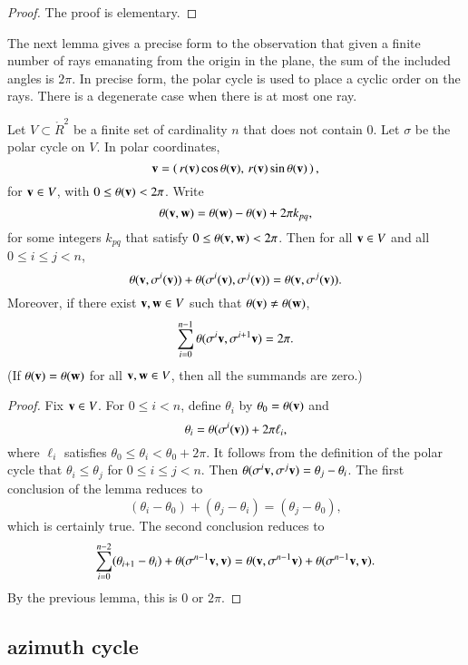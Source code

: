 \begin{proof} The proof is elementary.
\end{proof}

The next lemma gives a precise form to the observation
that given a finite number of rays emanating from the origin
in the plane, the sum of the included angles is $2\pi$.
In precise form, the polar cycle is used to place
a cyclic order on the rays.  There is a degenerate case
when there is at most one ray.


\begin{lemma}[]\label{lemma:polar-sum}
  Let $V\subset\ring{R}^2$ be a finite set of cardinality $n$ that
  does not contain $0$.  Let $\sigma$ be the polar cycle on $V$.  In
  polar coordinates,
\[ 
{\mathbf v}=\left(\, r({\mathbf v})\cos\theta({\mathbf v}),\, r({\mathbf v})\sin\theta({\mathbf v})\,\right),
\]  
for ${\mathbf v}\in V$, with
$0\le\theta({\mathbf v})<2\pi$.
Write
\[ 
\theta({\mathbf v},{\mathbf w}) = \theta({\mathbf w}) - \theta({\mathbf v}) + 2\pi k_{pq},
\] 
for some integers $k_{pq}$ that satisfy $0\le \theta({\mathbf v},{\mathbf w}) < 2\pi$.
Then for all ${\mathbf v}\in V$
and all $0\le i \le j < n$,
\[ 
\theta({\mathbf v},\sigma^i({\mathbf v})) +\theta(\sigma^i({\mathbf v}),\sigma^j({\mathbf v})) =
\theta({\mathbf v},\sigma^j({\mathbf v})).
\] 
Moreover, if there exist ${\mathbf v},{\mathbf w}\in V$ such that $\theta({\mathbf v})\ne\theta({\mathbf w})$,
\[ 
\sum_{i=0}^{n-1} \theta(\sigma^{i}{\mathbf v},\sigma^{i+1} {\mathbf v}) = 2\pi.
\] 
(If $\theta({\mathbf v})=\theta({\mathbf w})$ for all ${\mathbf v},{\mathbf w}\in V$, then all the
summands are zero.)
\end{lemma}
%

\begin{proof}
Fix ${\mathbf v}\in V$.
For $0\le i<n$, define $\theta_i$ by
$\theta_0=\theta({\mathbf v})$ and 
\[ \theta_i = \theta(\sigma^i({\mathbf v})) + 2\pi \ell_i,
\] 
where  $\ell_i$ satisfies $\theta_0\le \theta_i < \theta_0+2\pi$.
It follows from the definition of the polar cycle that
$\theta_i \le \theta_j$ for $0\le i\le j < n$.  Then
$\theta(\sigma^i {\mathbf v} ,\sigma^j {\mathbf v}) = \theta_j - \theta_i$.
The first conclusion of the lemma reduces to
\[ 
(\theta_i-\theta_0) + (\theta_j-\theta_i) = (\theta_j-\theta_0),
\] 
which is certainly true.
The second conclusion reduces to
\[ 
\sum_{i=0}^{n-2} (\theta_{i+1}-\theta_i) + \theta(\sigma^{n-1}{\mathbf v},{\mathbf v})
= \theta({\mathbf v},\sigma^{n-1}{\mathbf v}) + \theta(\sigma^{n-1}{\mathbf v},{\mathbf v}).
\] 
By the previous lemma, this is $0$ or $2\pi$.
\end{proof}


\subsection{azimuth cycle}

